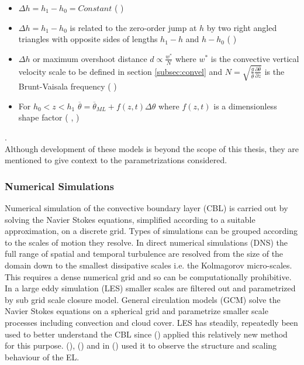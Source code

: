 \begin{itemize}
\item{$\Delta h = h_{1} - h_{0} = Constant$ (\citeauthor{Betts74} \citeyear{Betts74})}

\item{$\Delta h = h_{1} - h_{0}$ is related to the zero-order jump at $h$ by two right angled triangles with opposite sides
of lengths $h_{1} - h$ and $h - h_{0}$ (\citeauthor{BatchGryn} \citeyear{BatchGryn})}

\item{$\Delta h$ or maximum overshoot distance $d \propto \frac{w^{*}}{N}$ where $w^{*}$ is the convective vertical velocity scale to be defined in section \ref{subsec:convel} and $N = \sqrt{\frac{g}{\overline{\theta}} \frac{\partial \overline{\theta}}{\partial z}}$ is the Brunt-Vaisala frequency (\citeauthor{Stull73} \citeyear{Stull73})}
 
\item{For $h_{0}<z<h_{1}$ $\overline{\theta} = \overline{\theta}_{ML} + f(z,t) \Delta \theta$ where $f(z,t)$ is a dimensionless shape factor (\citeauthor{Deardorff79} \citeyear{Deardorff79}, \citeauthor{FedConzMir04} \citeyear{FedConzMir04})}
\end{itemize}
 .\\

Although development of these models is beyond the scope of this thesis, they are mentioned to give context to the parametrizations considered. \\         

\subsubsection{Numerical Simulations}
\label{subsubsec:}

Numerical simulation of the convective boundary layer (\acs{CBL}) is carried out by solving the Navier Stokes equations, simplified according to a suitable approximation, on a discrete grid.  Types of simulations can be grouped according to the scales of motion they resolve.  In direct numerical simulations (\acs{DNS}) the full range of spatial and temporal turbulence are resolved from the size of the domain down to the smallest dissipative scales i.e. the Kolmagorov micro-scales.  This requires a dense numerical grid and so can be computationally prohibitive.\\

In a large eddy simulation (\acs{LES}) smaller scales are filtered out and parametrized by sub grid scale closure model. General circulation models (\acs{GCM}) solve the Navier Stokes equations on a spherical grid and parametrize smaller scale processes including convection and cloud cover.  \acs{LES} has steadily, repeatedly been used to better understand the \acs{CBL} since \citeauthor{Deardorff72} (\citeyear{Deardorff72}) applied this relatively new method for this purpose.  \citeauthor{SullMoengStev} (\citeyear{SullMoengStev}), \citeauthor{FedConzMir04} (\citeyear{FedConzMir04}) and \citeauthor{BrooksFowler2} in (\citeyear{BrooksFowler2}) used it to observe the structure and scaling behaviour of the \acs{EL}.\\

